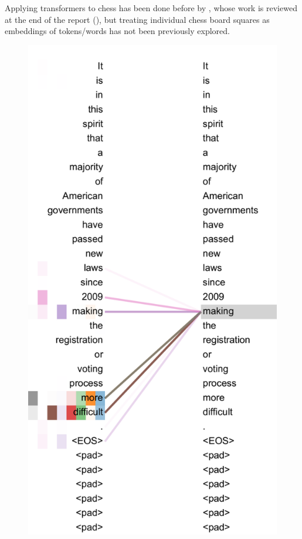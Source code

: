 Applying transformers to chess has been done before by
\citet{chessTransformer}, whose work is reviewed at the end of the report
(), but treating individual chess board squares
as embeddings of tokens/words has not been previously explored.

\begin{figure}[H]
  \begin{minipage}{0.475\textwidth}
    \centering
    \includegraphics[width=\textwidth]{project/img/attention.png}

\end{minipage}
\end{figure}

